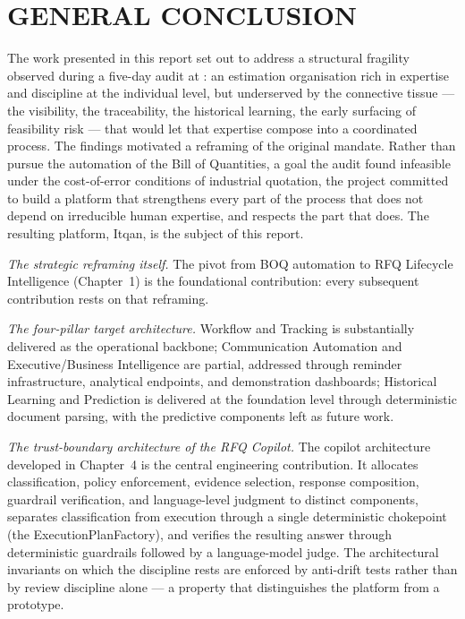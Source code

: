 \chapter*{GENERAL CONCLUSION}
\adjustmtc
\thispagestyle{MyStyle}

The work presented in this report set out to address a structural fragility observed during a five-day audit at \clientCompany: an estimation organisation rich in expertise and discipline at the individual level, but underserved by the connective tissue --- the visibility, the traceability, the historical learning, the early surfacing of feasibility risk --- that would let that expertise compose into a coordinated process. The findings motivated a reframing of the original mandate. Rather than pursue the automation of the Bill of Quantities, a goal the audit found infeasible under the cost-of-error conditions of industrial quotation, the project committed to build a platform that strengthens every part of the process that does not depend on irreducible human expertise, and respects the part that does. The resulting platform, Itqan, is the subject of this report.

\textit{The strategic reframing itself.} The pivot from BOQ automation to RFQ Lifecycle Intelligence (Chapter~1) is the foundational contribution: every subsequent contribution rests on that reframing.

\textit{The four-pillar target architecture.} Workflow and Tracking is substantially delivered as the operational backbone; Communication Automation and Executive/Business Intelligence are partial, addressed through reminder infrastructure, analytical endpoints, and demonstration dashboards; Historical Learning and Prediction is delivered at the foundation level through deterministic document parsing, with the predictive components left as future work.

\textit{The trust-boundary architecture of the RFQ Copilot.} The copilot architecture developed in Chapter~4 is the central engineering contribution. It allocates classification, policy enforcement, evidence selection, response composition, guardrail verification, and language-level judgment to distinct components, separates classification from execution through a single deterministic chokepoint (the ExecutionPlanFactory), and verifies the resulting answer through deterministic guardrails followed by a language-model judge. The architectural invariants on which the discipline rests are enforced by anti-drift tests rather than by review discipline alone --- a property that distinguishes the platform from a prototype.

